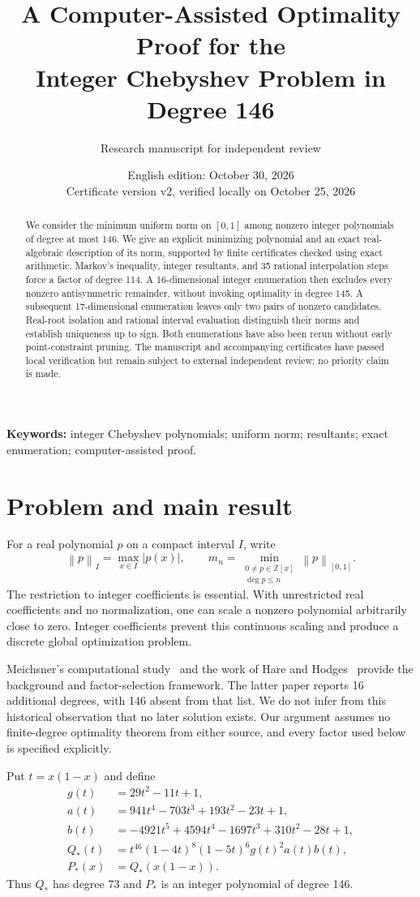 \documentclass[11pt,a4paper]{article}
\title{A Computer-Assisted Optimality Proof for the\protect\\ Integer Chebyshev Problem in Degree 146}
\author{Research manuscript for independent review}
\date{English edition: October 30, 2026\\Certificate version v2, verified locally on October 25, 2026}
\newcommand{\Z}{\mathbb Z}
\newcommand{\norm}[1]{\left\lVert#1\right\rVert}
\begin{document}
\maketitle
\begin{abstract}
We consider the minimum uniform norm on $[0,1]$ among nonzero integer polynomials of degree at most 146. We give an explicit minimizing polynomial and an exact real-algebraic description of its norm, supported by finite certificates checked using exact arithmetic. Markov's inequality, integer resultants, and 35 rational interpolation steps force a factor of degree 114. A 16-dimensional integer enumeration then excludes every nonzero antisymmetric remainder, without invoking optimality in degree 145. A subsequent 17-dimensional enumeration leaves only two pairs of nonzero candidates. Real-root isolation and rational interval evaluation distinguish their norms and establish uniqueness up to sign. Both enumerations have also been rerun without early point-constraint pruning. The manuscript and accompanying certificates have passed local verification but remain subject to external independent review; no priority claim is made.
\end{abstract}
\noindent\textbf{Keywords:} integer Chebyshev polynomials; uniform norm; resultants; exact enumeration; computer-assisted proof.

\section{Problem and main result}
For a real polynomial $p$ on a compact interval $I$, write
\[
\norm p_I=\max_{x\in I}|p(x)|,\qquad
m_n=\min_{\substack{0\ne p\in\Z[x]\\\deg p\le n}}\norm p_{[0,1]}.
\]
The restriction to integer coefficients is essential. With unrestricted real coefficients and no normalization, one can scale a nonzero polynomial arbitrarily close to zero. Integer coefficients prevent this continuous scaling and produce a discrete global optimization problem.

Meichsner's computational study~\cite{meichsner} and the work of Hare and Hodges~\cite{hare} provide the background and factor-selection framework. The latter paper reports 16 additional degrees, with 146 absent from that list. We do not infer from this historical observation that no later solution exists. Our argument assumes no finite-degree optimality theorem from either source, and every factor used below is specified explicitly.

Put $t=x(1-x)$ and define
\begin{align*}
g(t)&=29t^2-11t+1,\\
a(t)&=941t^4-703t^3+193t^2-23t+1,\\
b(t)&=-4921t^5+4594t^4-1697t^3+310t^2-28t+1,\\
Q_*(t)&=t^{46}(1-4t)^8(1-5t)^6g(t)^2a(t)b(t),\\
P_*(x)&=Q_*(x(1-x)).
\end{align*}
Thus $Q_*$ has degree 73 and $P_*$ is an integer polynomial of degree 146.
\end{document}
